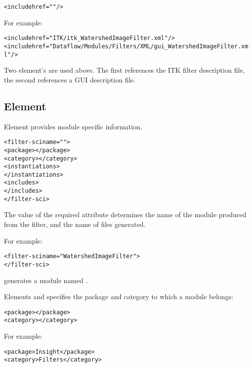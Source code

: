 \begin{alltt}
  <include href=""/>
\end{alltt}

For example:

\begin{alltt}
  <include href="ITK/itk_WatershedImageFilter.xml"/>
  <include href="Dataflow/Modules/Filters/XML/gui_WatershedImageFilter.xml"/>
\end{alltt}

Two  element's are used above.  The first
references the ITK filter description file, the second references a
GUI description file.


\subsection{Element }

Element  provides module specific information.

\begin{alltt}
  <filter-sci name="">
    <package></package>
    <category></category>
    <instantiations>
    \velide
    </instantiations>
    <includes>
    \velide
    </includes>
  </filter-sci>
\end{alltt}

The value of the required  attribute determines the name of
the \sr{} module produced from the filter, and the name of files generated. 

For example:

\begin{alltt}
  <filter-sci name="WatershedImageFilter">
  \velide
  </filter-sci>
\end{alltt}

generates a module named .

Elements  and  specifies
the package and category to which a module belongs:

\begin{alltt}
  <package></package>
  <category></category>
\end{alltt}

For example:

\begin{alltt}
  <package>Insight</package>
  <category>Filters</category>
\end{alltt}

